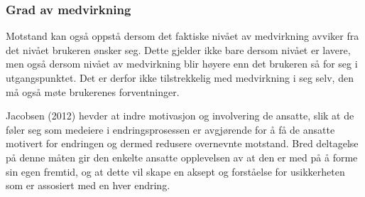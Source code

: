 \subsubsection{Grad av medvirkning}
Motstand kan også oppstå dersom det faktiske nivået av medvirkning avviker fra det nivået brukeren ønsker seg. Dette gjelder ikke bare dersom nivået er lavere, men også dersom nivået av medvirkning blir høyere enn det brukeren så for seg i utgangspunktet. Det er derfor ikke tilstrekkelig med medvirkning i seg selv, den må også møte brukerenes forventninger. \cite{Cavaye95}

\noindent
Jacobsen (2012) hevder at indre motivasjon og involvering de ansatte, slik at de føler seg som medeiere i endringsprosessen er avgjørende for å få de ansatte motivert for endringen og dermed redusere overnevnte motstand. Bred deltagelse på denne måten gir den enkelte ansatte opplevelsen av at den er med på å forme sin egen fremtid, og at dette vil skape en aksept og forståelse for usikkerheten som er assosiert med en hver endring.